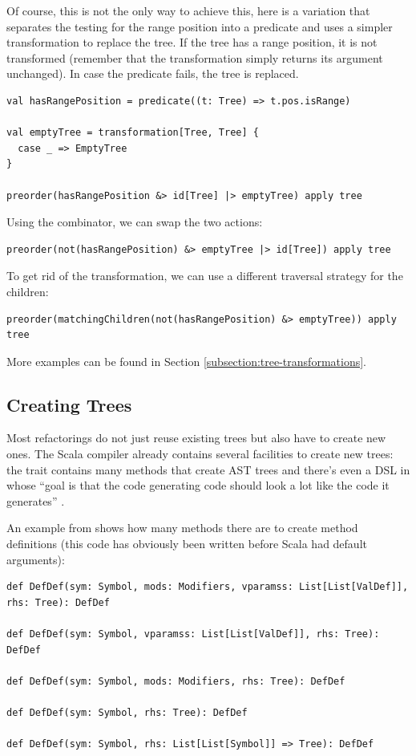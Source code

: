 Of course, this is not the only way to achieve this, here is a variation that separates the testing for the range position into a predicate and uses a simpler transformation to replace the tree. If the tree has a range position, it is not transformed (remember that the  transformation simply returns its argument unchanged). In case the predicate fails, the tree is replaced.

\begin{lstlisting}
val hasRangePosition = predicate((t: Tree) => t.pos.isRange)

val emptyTree = transformation[Tree, Tree] {
  case _ => EmptyTree
}

preorder(hasRangePosition &> id[Tree] |> emptyTree) apply tree
\end{lstlisting}

Using the  combinator, we can swap the two actions:

\begin{lstlisting}
preorder(not(hasRangePosition) &> emptyTree |> id[Tree]) apply tree
\end{lstlisting}

To get rid of the  transformation, we can use a different traversal strategy for the children:

\begin{lstlisting}
preorder(matchingChildren(not(hasRangePosition) &> emptyTree)) apply tree
\end{lstlisting}

More examples can be found in Section \vref{subsection:tree-transformations}.

\subsection{Creating Trees}

Most refactorings do not just reuse existing trees but also have to create new ones. The Scala compiler already contains several facilities to create new trees: the trait  contains many methods that create AST trees and there's even a DSL in  whose ``goal is that the code generating code should look a lot like the code it generates'' \cite{TreeDSL}.

An example from  shows how many methods there are to create method definitions (this code has obviously been written before Scala had default arguments):

\begin{lstlisting}
def DefDef(sym: Symbol, mods: Modifiers, vparamss: List[List[ValDef]], rhs: Tree): DefDef

def DefDef(sym: Symbol, vparamss: List[List[ValDef]], rhs: Tree): DefDef
  
def DefDef(sym: Symbol, mods: Modifiers, rhs: Tree): DefDef

def DefDef(sym: Symbol, rhs: Tree): DefDef

def DefDef(sym: Symbol, rhs: List[List[Symbol]] => Tree): DefDef
\end{lstlisting}

